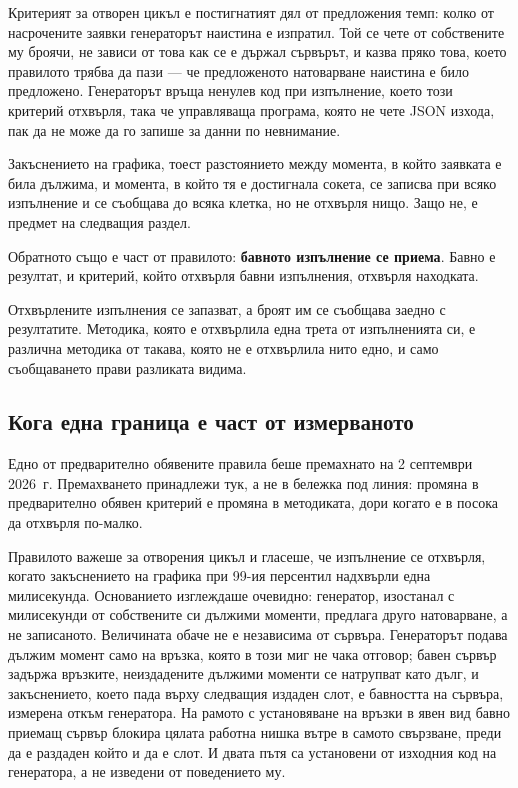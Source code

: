 Критерият за отворен цикъл е постигнатият дял от предложения темп: колко от насрочените заявки
генераторът наистина е изпратил. Той се чете от собствените му броячи, не зависи от това как се е
държал сървърът, и казва пряко това, което правилото трябва да пази — че предложеното натоварване
наистина е било предложено. Генераторът връща ненулев код при изпълнение, което този критерий
отхвърля, така че управляваща програма, която не чете JSON изхода, пак да не може да го запише за
данни по невнимание.

Закъснението на графика, тоест разстоянието между момента, в който заявката е била дължима, и
момента, в който тя е достигнала сокета, се записва при всяко изпълнение и се съобщава до всяка
клетка, но не отхвърля нищо. Защо не, е предмет на следващия раздел.

Обратното също е част от правилото: \textbf{бавното изпълнение се приема}. Бавно е резултат,
и критерий, който отхвърля бавни изпълнения, отхвърля находката.

Отхвърлените изпълнения се запазват, а броят им се съобщава заедно с резултатите. Методика,
която е отхвърлила една трета от изпълненията си, е различна методика от такава, която не е
отхвърлила нито едно, и само съобщаването прави разликата видима.

\subsection{Кога една граница е част от измерваното}
\label{sec:pacing-covariate}

Едно от предварително обявените правила беше премахнато на 2 септември 2026~г. Премахването
принадлежи тук, а не в бележка под линия: промяна в предварително обявен критерий е промяна в
методиката, дори когато е в посока да отхвърля по-малко.

Правилото важеше за отворения цикъл и гласеше, че изпълнение се отхвърля, когато закъснението на
графика при 99-ия персентил надхвърли една милисекунда. Основанието изглеждаше очевидно:
генератор, изостанал с милисекунди от собствените си дължими моменти, предлага друго натоварване,
а не записаното. Величината обаче не е независима от сървъра. Генераторът подава дължим момент
само на връзка, която в този миг не чака отговор; бавен сървър задържа връзките, неиздадените
дължими моменти се натрупват като дълг, и закъснението, което пада върху следващия издаден слот,
е бавността на сървъра, измерена откъм генератора. На рамото с установяване на връзки в явен вид
бавно приемащ сървър блокира цялата работна нишка вътре в самото свързване, преди да е раздаден
който и да е слот. И двата пътя са установени от изходния код на генератора, а не изведени от
поведението му.

